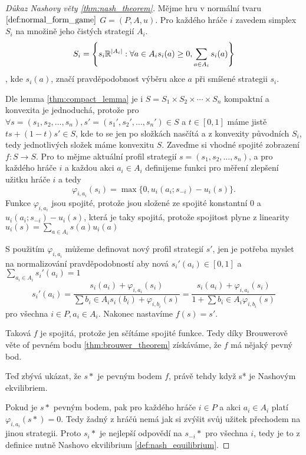 \begin{proof}[Důkaz Nashovy věty \ref{thm:nash_theorem}]
Mějme hru v normální tvaru $\ref{def:normal_form_game}$ $G = (P, A, u)$. 
Pro každého hráče $i$ zavedem simplex $S_i$ na množině jeho čistých strategií $A_i$. 
\[
    S_i = \left\{ s_i \mathbb{R}^{\left|A_i\right|}: \forall a \in A_i s_i(a) \geq 0, \sum_{a \in A_i} s_i(a) \right\}
\],
kde $s_i(a)$, značí pravděpodobnost výběru akce $a$ při smíšené strategii $s_i$. 

Dle lemma \ref{thm:compact_lemma} je i $S = S_1 \times S_2 \times \cdots \times S_n$ kompaktní a konvexita je jednoduchá, protože pro $\forall s =(s_1, s_2, \dots, s_n), s' =(s_1', s_2', \dots, s_n') \in S$ a $t \in [0,1]$ máme jistě $ts + (1-t)s' \in S$, kde to se jen po složkách nasčítá a z konvexity původních $S_i$, tedy jednotlivých složek máme konvexitu $S$. 
Zaveďme si vhodné spojité zobrazení $f: S \rightarrow S$. 
Pro to mějme aktuální profil strategií $s =(s_1, s_2, \dots, s_n)$, a pro každého hráče $i$ a každou akci $a_i \in A_i$ definijeme funkci pro měření zlepšení užitku hráče $i$ a tedy 
\[
    \varphi_{i,a_i}(s_i) = \max\{0,u_i(a_i; s_{-i}) - u_i(s) \}.
\]
Funkce $\varphi_{i,a_i}$ jsou spojité, protože jsou složené ze spojité konstantní $0$ a $u_i(a_i;s_{-i}) - u_i(s)$, která je taky spojitá, protože spojitost plyne z linearity $u_i(s) = \sum_{a \in A_i} s(a) u_i(a)$

S použitím $\varphi_{i,a_i}$ můžeme definovat nový profil strategií $s'$, jen je potřeba myslet na normalizování pravděpodobností aby nová $s_i'(a_i) \in [0,1]$ a $\sum_{a_i \in A_i} s_i'(a_i) = 1$
\[
    s_i'(a_i) = \frac{s_i(a_i) + \varphi_{i,a_i}(s_i)}{\sum{b_i \in A_i} s_i(b_i) + \varphi_{i,b_i}(s)} = \frac{s_i(a_i) + \varphi_{i,a_i}(s_i)}{1 + \sum{b_i \in A_i} \varphi_{i,b_i}(s)}
\]
pro všechna $i \in P, a_i \in A_i$. Nakonec nastavíme $f(s) = s'$. 

Taková $f$ je spojitá, protože jen sčítáme spojité funkce. Tedy díky Brouwerově věte of pevném bodu \ref{thm:brouwer_theorem} získáváme, že $f$ má nějaký pevný bod. 

Teď zbývá ukázat, že $s*$ je pevným bodem $f$, právě tehdy když s* je Nashovým ekvilibriem. 

Pokud je $s*$ pevným bodem, pak pro každého hráče $i \in P$ a akci $a_i \in A_i$ platí $\varphi_{i,a_i}(s*) = 0$. Tedy žadný z hráčů nemá jak si zvýšit svůj užitek přechodem na jinou strategii. 
Proto $s_i*$ je nejlepší odpovědí na $s_{-i}*$ pro všechna $i$, tedy je to z definice nutně Nashovo ekvilibrium \ref{def:nash_equilibrium}.
\end{proof}
